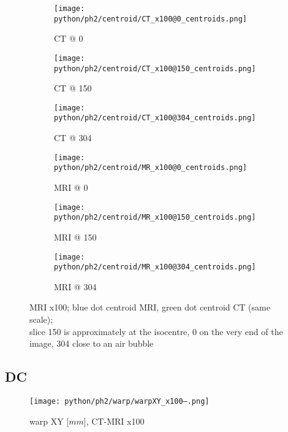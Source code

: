 \begin{figure}[!tbp]
  \begin{subfigure}[b]{0.32\textwidth}
    \texttt{[image: python/ph2/centroid/CT\_x100@0\_centroids.png]}
    \caption{CT @ 0}
    \label{fig:CT_x100_centroids@0}
  \end{subfigure}
  \begin{subfigure}[b]{0.32\textwidth}
    \texttt{[image: python/ph2/centroid/CT\_x100@150\_centroids.png]}
    \caption{CT @ 150}
    \label{fig:CT_x100_centroids@150}
  \end{subfigure}
  \begin{subfigure}[b]{0.32\textwidth}
    \texttt{[image: python/ph2/centroid/CT\_x100@304\_centroids.png]}
    \caption{CT @ 304}
    \label{fig:CT_x100_centroids@304}
  \end{subfigure}
  \begin{subfigure}[b]{0.32\textwidth}
    \texttt{[image: python/ph2/centroid/MR\_x100@0\_centroids.png]}
    \caption{MRI @ 0}
    \label{fig:MR_x100_centroids@0}
  \end{subfigure}
  \begin{subfigure}[b]{0.32\textwidth}
    \texttt{[image: python/ph2/centroid/MR\_x100@150\_centroids.png]}
    \caption{MRI @ 150}
    \label{fig:MR_x100_centroids@150}
  \end{subfigure}
  \begin{subfigure}[b]{0.32\textwidth}
    \texttt{[image: python/ph2/centroid/MR\_x100@304\_centroids.png]}
    \caption{MRI @ 304}
    \label{fig:MR_x100_centroids@304}
  \end{subfigure}
  \caption{MRI x100; blue dot centroid MRI, green dot centroid CT (same scale);\\ slice 150 is approximately at the isocentre, 0 on the very end of the image, 304 close to an air bubble}
  \label{fig:MR_x100_centroids}
\end{figure}

\clearpage

\subsection{DC}

\begin{figure}[!bp]
  \centering
  \texttt{[image: python/ph2/warp/warpXY\_x100--.png]}
  \caption{warp XY [$mm$], CT-MRI x100}
  \label{fig:warpXY_x100}
\end{figure}

